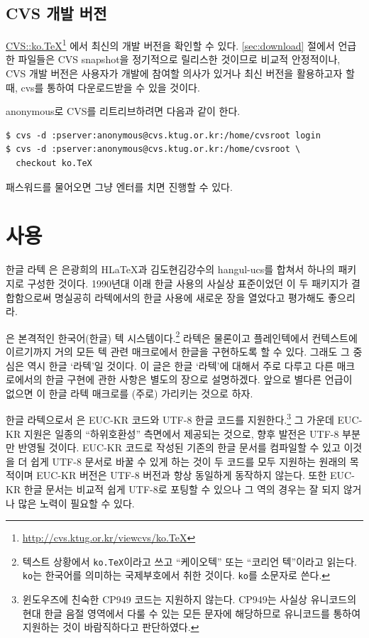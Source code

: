 \section{CVS 개발 버전}

\href{http://cvs.ktug.or.kr/viewcvs/ko.TeX/}{CVS::ko.TeX}\footnote{%
  \url{http://cvs.ktug.or.kr/viewcvs/ko.TeX}}%
에서
최신의 개발 버전을 확인할 수 있다. \ref{sec:download} 절에서 언급한
파일들은 CVS snapshot을 정기적으로 릴리스한 것이므로 비교적 안정적이나,
CVS 개발 버전은 사용자가 개발에 참여할 의사가 있거나 최신 버전을 활용하고자 할 
때, cvs를 통하여 다운로드받을 수 있을 것이다. 

anonymous로 CVS를 리트리브하려면 다음과 같이 한다.
\begin{verbatim}
$ cvs -d :pserver:anonymous@cvs.ktug.or.kr:/home/cvsroot login
$ cvs -d :pserver:anonymous@cvs.ktug.or.kr:/home/cvsroot \
  checkout ko.TeX
\end{verbatim}
패스워드를 물어오면 그냥 엔터를 치면 진행할 수 있다.

\chapter{사용}

한글 라텍 \kotex 은 은광희의 H\LaTeX 과 김도현\cntrdot 김강수의 hangul-ucs를 
합쳐서 하나의 패키지로 구성한 것이다. 1990년대 이래 한글 사용의 사실상
표준이었던 이 두 패키지가 결합함으로써 명실공히 라텍에서의 한글 사용에
새로운 장을 열었다고 평가해도 좋으리라.

\kotex 은 본격적인 한국어(한글) 텍 시스템이다.\footnote{ 텍스트
  상황에서 \texttt{ko.TeX}이라고 쓰고 ``케이오텍'' 또는
  ``코리언 텍''이라고 읽는다. \texttt{ko}는 한국어를 의미하는
  국제부호에서 취한 것이다. \texttt{ko}를 소문자로 쓴다.}
라텍은 물론이고 플레인텍에서 컨텍스트에
이르기까지 거의 모든 텍 관련 매크로에서 한글을 구현하도록 할 수 있다.
그래도 그 중심은 역시 한글 `라텍'일 것이다. 
이 글은 한글 `라텍'에 대해서 주로 다루고 다른 매크로에서의 한글 구현에
관한 사항은 별도의 장으로 설명하겠다. 앞으로 별다른 언급이 없으면 \kotex 이
한글 라텍 매크로를 (주로) 가리키는 것으로 하자.

한글 라텍으로서 \kotex 은
EUC-KR 코드와 UTF-8 한글 코드를 지원한다.\footnote{%
  윈도우즈에 친숙한 CP949 코드는 지원하지 않는다. CP949는 사실상
  유니코드의 현대 한글 음절 영역에서 다룰 수 있는 모든 문자에
  해당하므로 유니코드를 통하여 지원하는 것이 바람직하다고 판단하였다.}
그 가운데 EUC-KR 지원은 일종의 ``하위호환성'' 측면에서 제공되는 것으로,
향후 발전은 UTF-8 부분만 반영될 것이다. EUC-KR 코드로 작성된 기존의 한글 문서를
컴파일할 수 있고 이것을 더 쉽게 UTF-8 문서로 바꿀 수 있게 하는 것이
두 코드를 모두 지원하는 원래의 목적이며 EUC-KR 버전은 UTF-8 버전과
항상 동일하게 동작하지 않는다. 또한 EUC-KR 한글 문서는 비교적 쉽게
UTF-8로 포팅할 수 있으나 그 역의 경우는 잘 되지 않거나 많은 노력이
필요할 수 있다. 

